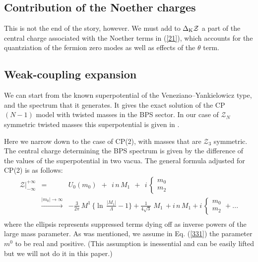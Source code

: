 \documentclass[epsfig,12pt]{article}
\newcommand{\mc}[1]{\mathcal{#1}}
\begin{document}
\subsection{Contribution of the Noether charges}

This is not the end of the story, however. We must add to $\Delta_{\rm K}{\mathcal Z}$
a part of the central charge associated with the Noether terms in (\ref{21}), which accounts for the quantziation of the
fermion zero modes as well as effects of the $\theta$ term.


\subsection{Weak-coupling expansion}

       We can start from the known superpotential of the Veneziano--Yankielowicz type, and the spectrum that it generates.
       It gives the  exact solution of the CP$(N-1)$ model with twisted masses in the BPS sector. 
       In our case of $\mc{Z}_N$ symmetric twisted masses this superpotential is given in \cite{Bolokhov:2011mp}.
       
       Here we narrow down to the case of CP(2), with masses that are $ \mc{Z}_3 $ symmetric.
The central charge determining the BPS spectrum is given by the difference of the values of the superpotential in  two vacua.
The general formula adjusted for CP(2) is  \cite{Bolokhov:2011mp} as follows:
\begin{eqnarray}
       \mc{Z}\Big|^{\scriptscriptstyle +\infty}_{\scriptscriptstyle -\infty} 
       &=&
       U_0(m_0)  ~~+~~ i\, n\, M_1 ~~+~~ i\, \left\{
       \begin{array}{ll}
       m_0\\[1mm]m_2
       \end{array}
       \right.
       \nonumber\\[3mm]
       &\stackrel{|m_0|\to\infty}{\longrightarrow}&
-
       \frac{3}{2\pi}\, M^1\, \Big\{ \ln\, \frac {   |M_1|   }
                                                 {  \Lambda  } -1 \Big\} +  \frac{1}{4\sqrt{3}}\; M_1\, +i\,n\, M_1
       +  i\,\left\{
       \begin{array}{ll}
       m_0\\[1mm]m_2
       \end{array}
       \right. +
       ...
        \nonumber\\[3mm]
       \label{331}
\end{eqnarray}
       where the ellipsis represents  suppressed terms dying off as inverse powers of the large mass parameter.
As was mentioned, we assume  in Eq. (\ref{331}) the parameter $ m^0 $ to be real 
and positive. (This assumption is inessential and can be easily lifted but we will not do it in this paper.)
\end{document}
